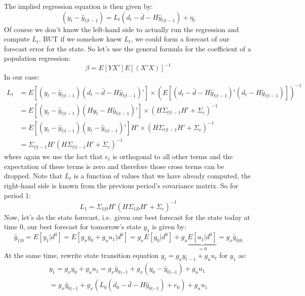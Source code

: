 \begin{enumerate}
The implied regression equation is then given by:
\begin{equation*}
(y_t-\hat{y}_{t|t-1}) = L_t (d_t - \bar{d} - H \hat{y}_{t|t-1}) + \eta_t
\end{equation*}
Of course we don't know the left-hand side to actually run the regression and compute \(L_t\).
BUT if we somehow knew \(L_t\), we could form a forecast of our forecast error for the state.
So let's use the general formula for the coefficient of a population regression:
\begin{equation*}
\beta = E{[YX']}E{[(X'X)]}^{-1}
\end{equation*}
In our case:
\begin{align*}
L_t &= E\left[ (y_t-\hat{y}_{t|t-1}) (d_t - \bar{d} - H \hat{y}_{t|t-1})' \right] \times {\left(E\left[ (d_t - \bar{d} - H \hat{y}_{t|t-1})' (d_t - H \hat{y}_{t|t-1})\right]\right)}^{-1}
\\
&=E\left[ (y_t-\hat{y}_{t|t-1}) (H y_t - H \hat{y}_{t|t-1})' \right] \times {\left( H\Sigma_{t|t-1}H'+\Sigma_e\right)}^{-1}
\\
&=E\left[ (y_t-\hat{y}_{t|t-1}) (y_t - \hat{y}_{t|t-1})'\right]H' \times {\left( H\Sigma_{t|t-1}H'+\Sigma_e\right)}^{-1}
\\
&= \Sigma_{t|t-1} H'{(H\Sigma_{t|t-1}H' + \Sigma_e)}^{-1}
\end{align*}
  where again we use the fact that \(e_t\) is orthogonal to all other terms
  and the expectation of these terms is zero and therefore those cross terms can be dropped.
Note that \(L_t\) is a function of values that we have already computed,
  the right-hand side is known from the previous period's covariance matrix.
So for period 1:
\begin{equation*}
L_1 = \Sigma_{1|0} H'{(H\Sigma_{1|0}H' + \Sigma_e)}^{-1}
\end{equation*}
Now, let's do the state forecast, i.e.\ given our best forecast for the state today at time 0,
  our best forecast for tomorrow's state \(y_1\) is given by:
\begin{equation*}
\hat{y}_{1|0} = E[y_1|d^0] = E[g_x y_0 + g_u u_1|d^0] = g_x E[ y_0|d^0] + g_u \underbrace{E[u_1|d^0]}_{=0} = g_x \hat{y}_{0|0}
\end{equation*}
At the same time, rewrite state transition equation \(y_t = g_x y_{t-1} + g_u u_t\) for \(y_1\) as:
\begin{multline*}
y_1 = g_x y_{0} + g_u u_1 = g_x \hat{y}_{0|-1} + g_x(y_0-\hat{y}_{0|-1}) + g_u u_1
\\
= g_x \hat{y}_{0|-1} + g_x\left(L_0\left(d_0-\bar{d}-H\hat{y}_{0|-1}\right)+e_0\right) + g_u u_1

\end{multline*}
\end{enumerate}
